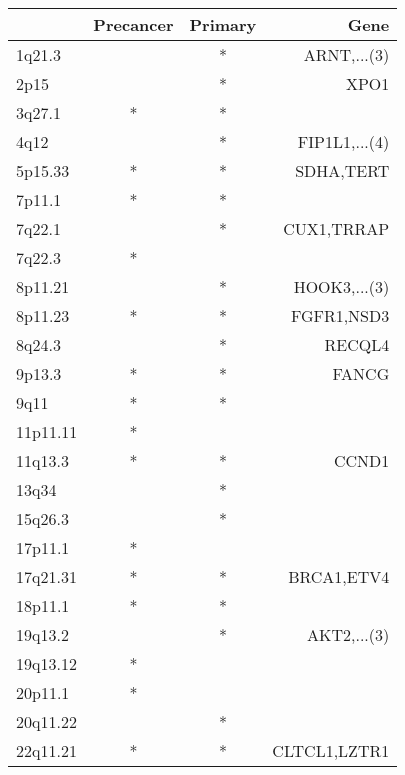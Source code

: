 \begin{tabular}{lccr}
\toprule
{} & Precancer & Primary &           Gene \\
\midrule
1q21.3   &           &       * &    ARNT,...(3) \\
2p15     &           &       * &           XPO1 \\
3q27.1   &         * &       * &                \\
4q12     &           &       * &  FIP1L1,...(4) \\
5p15.33  &         * &       * &      SDHA,TERT \\
7p11.1   &         * &       * &                \\
7q22.1   &           &       * &     CUX1,TRRAP \\
7q22.3   &         * &         &                \\
8p11.21  &           &       * &   HOOK3,...(3) \\
8p11.23  &         * &       * &     FGFR1,NSD3 \\
8q24.3   &           &       * &         RECQL4 \\
9p13.3   &         * &       * &          FANCG \\
9q11     &         * &       * &                \\
11p11.11 &         * &         &                \\
11q13.3  &         * &       * &          CCND1 \\
13q34    &           &       * &                \\
15q26.3  &           &       * &                \\
17p11.1  &         * &         &                \\
17q21.31 &         * &       * &     BRCA1,ETV4 \\
18p11.1  &         * &       * &                \\
19q13.2  &           &       * &    AKT2,...(3) \\
19q13.12 &         * &         &                \\
20p11.1  &         * &         &                \\
20q11.22 &           &       * &                \\
22q11.21 &         * &       * &   CLTCL1,LZTR1 \\
\bottomrule
\end{tabular}
